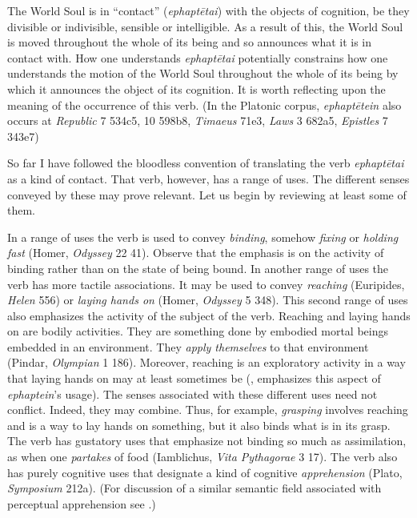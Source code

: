 The World Soul is in ``contact'' (\emph{ephaptētai}) with the objects of cognition, be they divisible or indivisible, sensible or intelligible. As a result of this, the World Soul is moved throughout the whole of its being and so announces what it is in contact with. How one understands \emph{ephaptētai} potentially constrains how one understands the motion of the World Soul throughout the whole of its being by which it announces the object of its cognition. It is worth reflecting upon the meaning of the occurrence of this verb. (In the Platonic corpus, \emph{ephaptētein} also occurs at \emph{Republic} 7 534c5, 10 598b8, \emph{Timaeus} 71e3, \emph{Laws} 3 682a5, \emph{Epistles} 7 343e7)

So far I have followed the bloodless convention of translating the verb \emph{ephaptētai} as a kind of contact. That verb, however, has a range of uses. The different senses conveyed by these may prove relevant. Let us begin by reviewing at least some of them.

In a range of uses the verb is used to convey \emph{binding}, somehow \emph{fixing} or \emph{holding fast} (Homer, \emph{Odyssey} 22 41). Observe that the emphasis is on the activity of binding rather than on the state of being bound. In another range of uses the verb has more tactile associations. It may be used to convey \emph{reaching} (Euripides, \emph{Helen} 556) or \emph{laying hands on} (Homer, \emph{Odyssey} 5 348). This second range of uses also emphasizes the activity of the subject of the verb. Reaching and laying hands on are bodily activities. They are something done by embodied mortal beings embedded in an environment. They \emph{apply themselves} to that environment (Pindar, \emph{Olympian} 1 186). Moreover, reaching is an exploratory activity in a way that laying hands on may at least sometimes be (\citealt[134]{Betegh:2019fq}, emphasizes this aspect of \emph{ephaptein}'s usage). The senses associated with these different uses need not conflict. Indeed, they may combine. Thus, for example, \emph{grasping} involves reaching and is a way to lay hands on something, but it also binds what is in its grasp. The verb has gustatory uses that emphasize not binding so much as assimilation, as when one \emph{partakes} of food (Iamblichus, \emph{Vita Pythagorae} 3 17). The verb also has purely cognitive uses that designate a kind of cognitive \emph{apprehension} (Plato, \emph{Symposium} 212a). (For discussion of a similar semantic field associated with perceptual apprehension see \citealt[chapters 1--2]{Kalderon:2018oe}.)

